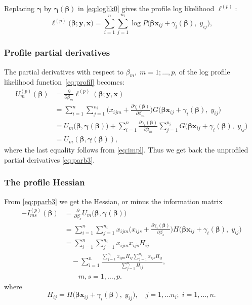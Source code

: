 \documentclass[a4paper,11pt]{article}
\newcommand{\bx}{\ensuremath{\mathbf{x}}}
\newcommand{\by}{\ensuremath{\mathbf{y}}}
\newcommand{\bb}{\ensuremath{\boldsymbol{\beta}}}
\newcommand{\bg}{\ensuremath{\boldsymbol{\gamma}}}
\newcommand{\pPy}{\ensuremath{P\big(\bb\bx_{ij} + \gamma_i(\bb), \;
    y_{ij}\big)}}
\newcommand{\pGy}{\ensuremath{G\big(\bb\bx_{ij} + \gamma_i(\bb), \;
    y_{ij}\big)}}
\newcommand{\pHy}{\ensuremath{H\big(\bb\bx_{ij} + \gamma_i(\bb), \;
    y_{ij}\big)}}
\newcommand{\dgdbs}{\ensuremath{\frac{\partial\gamma_i(\bb)}{\partial\beta_s}}}
\begin{document}
Replacing $\bg$ by $\bg(\bb)$ in \eqref{eq:loglik0} gives the profile log
likelihood $\ell^{(p)}$:
\begin{equation}\label{eq:profil}
\ell^{(p)}\big(\bb; \by, \bx\big) 
= \sum_{i = 1}^n \sum_{j=1}^{n_i}\log \pPy ,
\end{equation}


\subsubsection{Profile partial derivatives}
The partial derivatives with respect to $\beta_m, \; m = 1; \ldots, p$, of the log
profile likelihood function~\eqref{eq:profil} becomes: 
\begin{equation}\label{eq:pparb3}
\begin{split}
U_m^{(p)}(\bb) &= \frac{\partial}{\partial \beta_m} 
\ell^{(p)}(\bb; \by, \bx)\\
& =\sum_{i=1}^n \sum_{j=1}^{n_i} \bigg(x_{ijm} +
\frac{\partial\gamma_i(\bb)}{\partial\beta_m}\bigg)\pGy \\
&=  U_m\big(\bb, \bg(\bb)\big) +
\sum_{i=1}^n\frac{\partial\gamma_i(\bb)}{\partial\beta_m}
\sum_{j=1}^{n_i}\pGy \\
&=   U_m(\bb, \bg(\bb)),
\end{split}
\end{equation}
where the last equality follows from \eqref{eq:impl}.
 Thus we get
back the unprofiled partial derivatives \eqref{eq:parb3}.  
\subsubsection{The profile Hessian}

From \eqref{eq:pparb3} we get the Hessian, or minus the information matrix
\begin{equation}\label{eq:parhess}
\begin{split}
-I_{ms}^{(p)}(\bb) &= \frac{\partial}{\partial\beta_s} 
U_m\big(\bb, \bg(\bb)\big) \\
&= \sum_{i=1}^{n}\sum_{j=1}^{n_i} x_{ijm}\bigg(x_{ijs} + \dgdbs\bigg)\pHy
\\
&= \sum_{i=1}^n\sum_{j=1}^{n_i} x_{ijm} x_{ijs} H_{ij} \\
&\quad -\sum_{i=1}^n \frac{\sum_{j=1}^{n_i}x_{ijm} H_{ij} 
\sum_{j=1}^{n_i}x_{ijs}H_{ij}}
{\sum_{j=1}^{n_i}H_{ij}}, \\
&\qquad m, s = 1, \ldots, p.
\end{split}
\end{equation}  
where
\begin{equation*}
H_{ij} = \pHy, \quad j = 1, \ldots n_i; \; i = 1, \ldots, n.
\end{equation*} 
\end{document}
